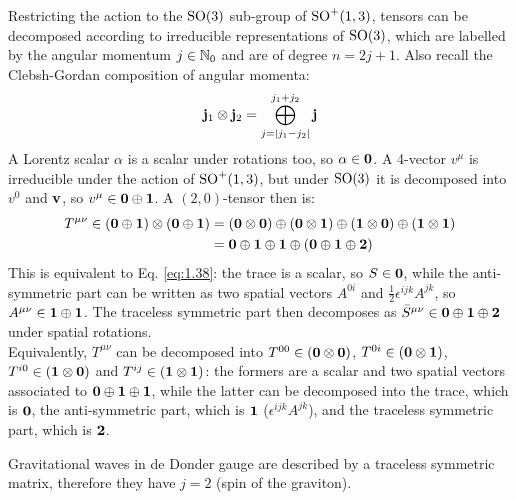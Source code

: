 Restricting the action to the $ \mathrm{SO}(3) $ sub-group of $ \mathrm{SO}^+(1,3) $, tensors can be decomposed according to irreducible representations of $ \mathrm{SO}(3) $, which are labelled by the angular momentum $ j \in \mathbb{N}_0 $ and are of degree $ n = 2j + 1 $. Also recall the Clebsh-Gordan composition of angular momenta:
\begin{equation}
  \mathbf{j}_1 \otimes \mathbf{j}_2 = \bigoplus_{j = \left\lvert j_1 - j_2\right\rvert}^{j_1 + j_2} \mathbf{j}
  \label{eq:1.39}
\end{equation}
A Lorentz scalar $ \alpha $ is a scalar under rotations too, so $ \alpha \in \mathbf{0} $. A 4-vector $ v^\mu $ is irreducible under the action of $ \mathrm{SO}^+(1,3) $, but under $ \mathrm{SO}(3) $ it is decomposed into $ v^0 $ and $ \mathbf{v} $, so $ v^\mu \in \mathbf{0} \oplus \mathbf{1} $. A $ (2,0) $-tensor then is:
\begin{equation*}
  \begin{split}
    T^{\mu \nu} \in \left( \mathbf{0} \oplus \mathbf{1} \right) \otimes \left( \mathbf{0} \oplus \mathbf{1} \right)
    &= \left( \mathbf{0} \otimes \mathbf{0} \right) \oplus \left( \mathbf{0} \otimes \mathbf{1} \right) \oplus \left( \mathbf{1} \otimes \mathbf{0} \right) \oplus \left( \mathbf{1} \otimes \mathbf{1} \right) \\
    &= \mathbf{0} \oplus \mathbf{1} \oplus \mathbf{1} \oplus \left( \mathbf{0} \oplus \mathbf{1} \oplus \mathbf{2} \right)
  \end{split}
\end{equation*}
This is equivalent to Eq. \ref{eq:1.38}: the trace is a scalar, so $ S \in \mathbf{0} $, while the anti-symmetric part can be written as two spatial vectors $ A^{0i} $ and $ \frac{1}{2} \epsilon^{ijk} A^{jk} $, so $ A^{\mu \nu} \in \mathbf{1} \oplus \mathbf{1} $. The traceless symmetric part then decomposes as $ \bar{S}^{\mu \nu} \in \mathbf{0} \oplus \mathbf{1} \oplus \mathbf{2} $ under spatial rotations.\\
Equivalently, $ T^{\mu \nu} $ can be decomposed into $ T^{00} \in \left( \mathbf{0} \otimes \mathbf{0} \right) $, $ T^{0i} \in \left( \mathbf{0} \otimes \mathbf{1} \right) $, $ T^{i0} \in \left( \mathbf{1} \otimes \mathbf{0} \right) $ and $ T^{ij} \in \left( \mathbf{1} \otimes \mathbf{1} \right) $: the formers are a scalar and two spatial vectors associated to $ \mathbf{0} \oplus \mathbf{1} \oplus \mathbf{1} $, while the latter can be decomposed into the trace, which is $ \mathbf{0} $, the anti-symmetric part, which is $ \mathbf{1} $ ($ \epsilon^{ijk} A^{jk} $), and the traceless symmetric part, which is $ \mathbf{2} $.

\begin{example}{}{}
  Gravitational waves in de Donder gauge are described by a traceless symmetric matrix, therefore they have $ j = 2 $ (spin of the graviton).
\end{example}

